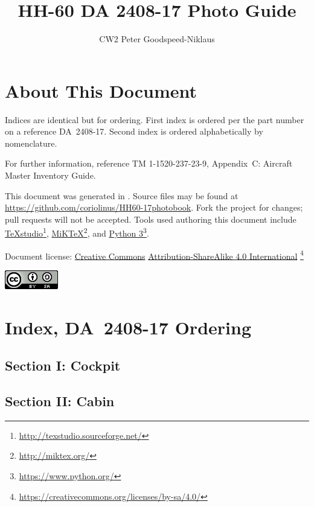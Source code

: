 \documentclass[letterpaper,11pt,openany,oneside]{book}
\author{CW2 Peter Goodspeed-Niklaus}
\title{HH-60 DA 2408-17 Photo Guide}
\begin{document}
\frontmatter
\setcounter{page}{0}
\maketitle
\clearpage
\captionsetup{labelformat=empty}
\chapter*{About This Document}
Indices are identical but for ordering. First index is ordered per the part number on a reference DA~2408-17. Second index is ordered alphabetically by nomenclature.

For further information, reference TM 1-1520-237-23-9, Appendix~C: Aircraft Master Inventory Guide.

This document was generated in \LaTeXe. Source files may be found at \url{https://github.com/coriolinus/HH60-17photobook}. Fork the project for changes; pull requests will not be accepted. Tools used authoring this document include \href{http://texstudio.sourceforge.net/}{TeXstudio}\footnote{\url{http://texstudio.sourceforge.net/}}, \href{http://miktex.org/}{MiKTeX}\footnote{\url{http://miktex.org/}}, and \href{https://www.python.org/}{Python 3}\footnote{\url{https://www.python.org/}}.

Document license: \href{https://creativecommons.org/}{Creative Commons} \href{https://creativecommons.org/licenses/by-sa/4.0/}{Attribution-ShareAlike 4.0 International}
\footnote{\url{https://creativecommons.org/licenses/by-sa/4.0/}}

\begin{center}
	\href{https://creativecommons.org/licenses/by-sa/4.0/}{\includegraphics{Images/cc-by-sa.png}}
\end{center}

\mainmatter
\chapter{Index, DA~2408-17 Ordering}
\section{Section I: Cockpit}

\clearpage
\section{Section II: Cabin}

\clearpage
\end{document}
